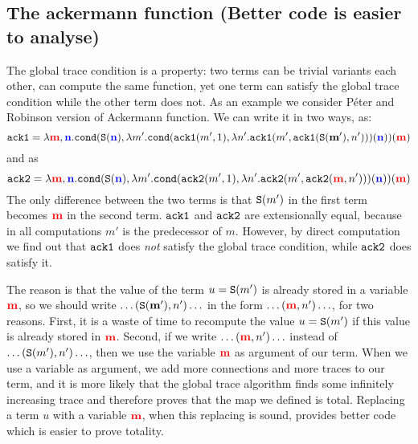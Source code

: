 \subsection{The ackermann function (Better code is easier to analyse)}
The global trace condition is a  property: two
terms can be trivial variants each other, can compute the same function, yet
one term can satisfy the global trace condition while the other term does not.
As an example we consider P\'{e}ter and Robinson version of Ackermann function. We can write it in two ways, as:
  \[
  {\tt ack1} = \lambda {{\bf \color{red}{m}}}, {{\bf \color{blue}{n}}}.{\tt cond}({\tt S}({{\bf \color{blue}{n}}}),\lambda m'.{\tt cond}({\tt ack1}(m',1),\lambda n'.{\tt ack1}(m',{\tt ack1}(\mathbf{{\tt S}(m')},n')))({{\bf \color{blue}{n}}}))({{\bf \color{red}{m}}})
  \]
and as 
  \[
  {\tt ack2} = \lambda {{\bf \color{red}{m}}}, {{\bf \color{blue}{n}}}.
{\tt cond}({\tt S}({{\bf \color{blue}{n}}}),\lambda m'.{\tt cond}({\tt ack2}(m',1),\lambda n'.{\tt ack2}(m',{\tt ack2}({{\bf \color{red}{m}}},n')))({{\bf \color{blue}{n}}}))({{\bf \color{red}{m}}})
  \]
The only difference between the two terms is that ${\tt S}(m')$ in the first
term becomes ${{\bf \color{red}{m}}}$ in the second term. ${\tt ack1}$ and ${\tt ack2}$ are 
extensionally equal, because in all computations $m'$ is the predecessor of $m$. 
However, by direct computation we find out that 
${\tt ack1}$ does \emph{not} satisfy the global trace condition, while ${\tt ack2}$ does
satisfy it. 

The reason is that the value of the term $u= {\tt S}(m')$ is already stored in a 
variable ${{\bf \color{red}{m}}}$, so we should write $\ldots (\mathbf{{\tt S}(m')},n') \ldots$ in the 
form  $\ldots ({{\bf \color{red}{m}}},n') \ldots$, for two reasons.
First, it is a waste of time to recompute the value $u= {\tt S}(m')$ if this value is 
already stored in ${{\bf \color{red}{m}}}$. Second, if we write $\ldots ({{\bf \color{red}{m}}},n') \ldots$ instead of 
$\ldots ({\tt S}(m'),n') \ldots$, then we use the variable ${{\bf \color{red}{m}}}$ as argument of our
term. When we use a variable as argument, we add more connections and 
more traces to our term, and it is more likely that the global trace algorithm finds 
some infinitely increasing trace and therefore proves that the map we defined is 
total. Replacing  a term $u$ with a variable ${{\bf \color{red}{m}}}$, when this replacing is sound, 
provides better code which is easier to prove totality.
